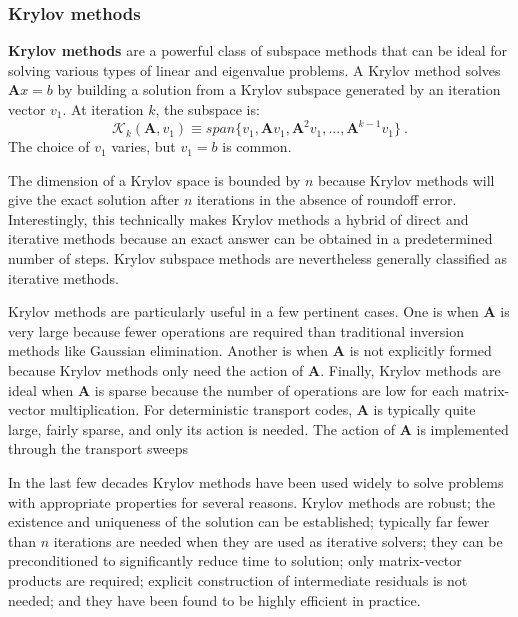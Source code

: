 \documentclass[12pt]{article}
\newcommand{\ve}[1]{\ensuremath{\mathbf{#1}}}
\begin{document}
\subsubsection*{Krylov methods}
\textbf{Krylov methods} are a powerful class of subspace methods that can be ideal for solving various types of linear and eigenvalue problems. A Krylov method solves $\ve{A}x = b$ by building a solution from a Krylov subspace generated by an iteration vector $v_{1}$. At iteration $k$, the subspace is:
%
\begin{equation}
  \mathcal{K}_{k}(\ve{A},v_{1}) \equiv span\{v_{1}, \ve{A}v_{1}, \ve{A}^{2}v_{1}, ..., \ve{A}^{k-1}v_{1}\} \:.
  \label{eq:Krylov-subspace}
\end{equation}
%
The choice of $v_{1}$ varies, but $v_{1} = b$ is common. %

The dimension of a Krylov space is bounded by $n$ because Krylov methods will give the exact solution after $n$ iterations in the absence of roundoff error. Interestingly, this technically makes Krylov methods a hybrid of direct and iterative methods because an exact answer can be obtained in a predetermined number of steps. Krylov subspace methods are nevertheless generally classified as iterative methods.%

Krylov methods are particularly useful in a few pertinent cases. One is when $\ve{A}$ is very large because fewer operations are required than traditional inversion methods like Gaussian elimination. Another is when $\ve{A}$ is not explicitly formed because Krylov methods only need the action of $\ve{A}$. Finally, Krylov methods are ideal when $\ve{A}$ is sparse because the number of operations are low for each matrix-vector multiplication. For deterministic transport codes, $\ve{A}$ is typically quite large, fairly sparse, and only its action is needed. The action of $\ve{A}$ is implemented through the transport sweeps%

In the last few decades Krylov methods have been used widely to solve problems with appropriate properties for several reasons. Krylov methods are robust; the existence and uniqueness of the solution can be established; typically far fewer than $n$ iterations are needed when they are used as iterative solvers; they can be preconditioned to significantly reduce time to solution; only matrix-vector products are required; explicit construction of intermediate residuals is not needed; and they have been found to be highly efficient in practice.%
\end{document}
